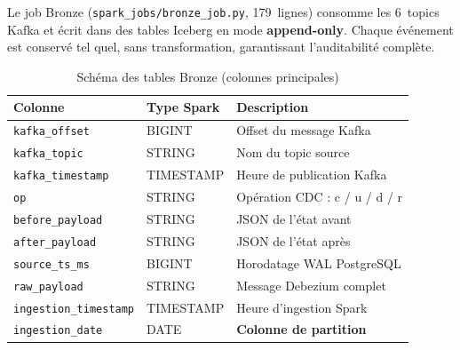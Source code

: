 \documentclass[12pt,a4paper]{report}
\begin{document}
Le job Bronze (\texttt{spark\_jobs/bronze\_job.py}, 179~lignes) consomme les
6~topics Kafka et écrit dans des tables Iceberg en mode \textbf{append-only}.
Chaque événement est conservé tel quel, sans transformation, garantissant
l'auditabilité complète.

\begin{table}[h]
\centering
\caption{Schéma des tables Bronze (colonnes principales)}
\label{tab:bronze}
\renewcommand{\arraystretch}{1.2}
\begin{tabular}{lll}
\toprule
\textbf{Colonne} & \textbf{Type Spark} & \textbf{Description} \\
\midrule
\texttt{kafka\_offset}       & BIGINT    & Offset du message Kafka \\
\texttt{kafka\_topic}        & STRING    & Nom du topic source \\
\texttt{kafka\_timestamp}    & TIMESTAMP & Heure de publication Kafka \\
\texttt{op}                  & STRING    & Opération CDC : c / u / d / r \\
\texttt{before\_payload}     & STRING    & JSON de l'état avant \\
\texttt{after\_payload}      & STRING    & JSON de l'état après \\
\texttt{source\_ts\_ms}      & BIGINT    & Horodatage WAL PostgreSQL \\
\texttt{raw\_payload}        & STRING    & Message Debezium complet \\
\texttt{ingestion\_timestamp}& TIMESTAMP & Heure d'ingestion Spark \\
\texttt{ingestion\_date}     & DATE      & \textbf{Colonne de partition} \\
\bottomrule
\end{tabular}
\end{table}
\end{document}
